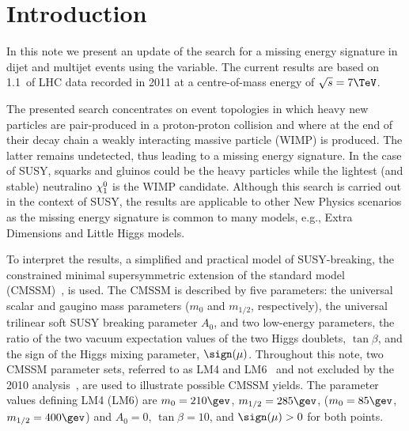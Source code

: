 \section{Introduction \label{sec:intro}}

In this note we present an update of the search for a missing energy
signature in dijet and multijet events using the \alt variable.
The current results are based on 1.1~\fbinv of LHC data recorded in
2011 at a centre-of-mass energy of $\sqrt{s} = 7 \tev$.

The presented search concentrates on event topologies in which heavy
new particles are pair-produced in a proton-proton collision and where
at the end of their decay chain a weakly interacting massive particle
(WIMP) is produced. The latter remains undetected, thus leading to a
missing energy signature. In the case of SUSY, squarks and gluinos
could be the heavy particles while the lightest (and stable)
neutralino $\chi^{0}_1$ is the WIMP candidate. Although this search
is carried out in the context of SUSY, the results are applicable to other
New Physics scenarios as the missing energy signature is common to
many models, e.g., Extra Dimensions and Little Higgs models.

To interpret the results, a simplified 
and practical model of SUSY-breaking, the constrained minimal 
supersymmetric extension of the standard model (CMSSM)~\cite{ref:CMSSM, ref:MSUGRA}, 
is used.  The CMSSM is described by five parameters: the universal scalar 
and gaugino mass parameters ($m_0$ and $m_{1/2}$, respectively), 
the universal trilinear soft SUSY breaking parameter $A_0$, and two low-energy parameters, 
the ratio of the two vacuum expectation values of the two Higgs doublets, 
$\tan\beta$, and the sign of the Higgs mixing parameter, $\sign(\mu)$. 
Throughout this note, two CMSSM parameter sets, referred to as LM4 and 
LM6~\cite{PTDRII} and not excluded by the 2010
analysis~\cite{RA1Paper}, are used to illustrate possible CMSSM yields. 
The parameter values defining LM4 (LM6) are $m_0=210\gev$, $m_{1/2}=285\gev$, 
($m_0=85\gev$, $m_{1/2}=400\gev$) and $A_0=0$, $\tan\beta=10$, 
and $\sign(\mu)>0$ for both points.  


